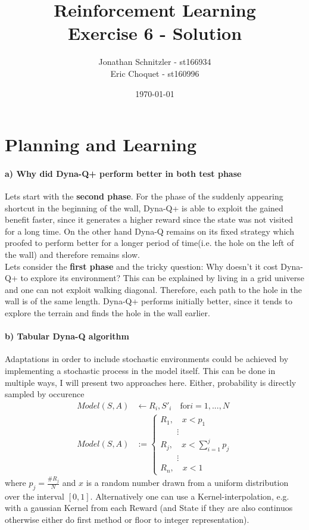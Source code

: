 \documentclass{article}
\title{Reinforcement Learning \\ Exercise 6 - Solution}
\author{Jonathan Schnitzler - st166934 \\
Eric Choquet - st160996}
\date{\today}
\begin{document}
\maketitle

\section{Planning and Learning}

\paragraph*{a) Why did Dyna-Q+ perform better in both test phase}

Lets start with the \textbf{second phase}. For the phase of the suddenly appearing shortcut in the beginning of the wall, Dyna-Q+ is able to exploit the gained benefit faster, since it generates a higher reward since the state was not visited for a long time. On the other hand Dyna-Q remains on its fixed strategy which proofed to perform better for a longer period of time(i.e. the hole on the left of the wall) and therefore remains slow. \\

Lets consider the \textbf{first phase} and the tricky question: Why doesn't it cost Dyna-Q+ to explore its environment? This can be explained by living in a grid universe and one can not exploit walking diagonal. Therefore, each path to the hole in the wall is of the same length. Dyna-Q+ performs initially better, since it tends to explore the terrain and finds the hole in the wall earlier.


\paragraph*{b) Tabular Dyna-Q algorithm}

Adaptations in order to include stochastic environments could be achieved by implementing a stochastic process in the model itself. This can be done in multiple ways, I will present two approaches here. Either, probability is directly sampled by occurence
\begin{align}
    Model(S,A) &\leftarrow R_i, S'_i \quad \text{for} i = 1,...,N \\
    Model(S, A) &:= \begin{cases} R_1, \quad x < p_1 \\
                                  \qquad \vdots \\
                                  R_j, \quad x < \sum_{i=1}^j p_j \\
                                  \qquad \vdots \\
                                  R_n, \quad x < 1
                    \end{cases}
\end{align}
where $p_j = \frac{\# R_j}{N}$ and $x$ is a random number drawn from a uniform distribution over the interval $[0, 1]$. Alternatively one can use a Kernel-interpolation, e.g. with a gaussian Kernel from each Reward (and State if they are also continuos otherwise either do first method or floor to integer representation). 
\end{document}
